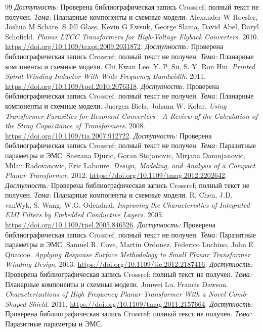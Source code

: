 \documentclass[14pt,a4paper]{extarticle}
\begin{document}
\begin{thebibliography}{99}
\textit{Доступность:} Проверена библиографическая запись Crossref; полный текст не получен. \textit{Тема:} Планарные компоненты и схемные модели.
Alexander W Roesler, Joshua M Schare, S Jill Glass, Kevin G Ewsuk, George Slama, David Abel, Daryl Schofield. \textit{Planar LTCC Transformers for High-Voltage Flyback Converters}. 2010.
\url{https://doi.org/10.1109/tcapt.2009.2031872}.
\textit{Доступность:} Проверена библиографическая запись Crossref; полный текст не получен. \textit{Тема:} Планарные компоненты и схемные модели.
Chi Kwan Lee, Y. P. Su, S. Y. Ron Hui. \textit{Printed Spiral Winding Inductor With Wide Frequency Bandwidth}. 2011.
\url{https://doi.org/10.1109/tpel.2010.2076318}.
\textit{Доступность:} Проверена библиографическая запись Crossref; полный текст не получен. \textit{Тема:} Планарные компоненты и схемные модели.
Juergen Biela, Johann W. Kolar. \textit{Using Transformer Parasitics for Resonant Converters—A Review of the Calculation of the Stray Capacitance of Transformers}. 2008.
\url{https://doi.org/10.1109/tia.2007.912722}.
\textit{Доступность:} Проверена библиографическая запись Crossref; полный текст не получен. \textit{Тема:} Паразитные параметры и ЭМС.
Snezana Djuric, Goran Stojanovic, Mirjana Damnjanovic, Milan Radovanovic, Eric Laboure. \textit{Design, Modeling, and Analysis of a Compact Planar Transformer}. 2012.
\url{https://doi.org/10.1109/tmag.2012.2202642}.
\textit{Доступность:} Проверена библиографическая запись Crossref; полный текст не получен. \textit{Тема:} Планарные компоненты и схемные модели.
R. Chen, J.D. vanWyk, S. Wang, W.G. Odendaal. \textit{Improving the Characteristics of Integrated EMI Filters by Embedded Conductive Layers}. 2005.
\url{https://doi.org/10.1109/tpel.2005.846526}.
\textit{Доступность:} Проверена библиографическая запись Crossref; полный текст не получен. \textit{Тема:} Паразитные параметры и ЭМС.
Samuel R. Cove, Martin Ordonez, Federico Luchino, John E. Quaicoe. \textit{Applying Response Surface Methodology to Small Planar Transformer Winding Design}. 2013.
\url{https://doi.org/10.1109/tie.2012.2187416}.
\textit{Доступность:} Проверена библиографическая запись Crossref; полный текст не получен. \textit{Тема:} Планарные компоненты и схемные модели.
Junwei Lu, Francis Dawson. \textit{Characterizations of High Frequency Planar Transformer With a Novel Comb-Shaped Shield}. 2011.
\url{https://doi.org/10.1109/tmag.2011.2157664}.
\textit{Доступность:} Проверена библиографическая запись Crossref; полный текст не получен. \textit{Тема:} Паразитные параметры и ЭМС.

\end{thebibliography}
\end{document}
